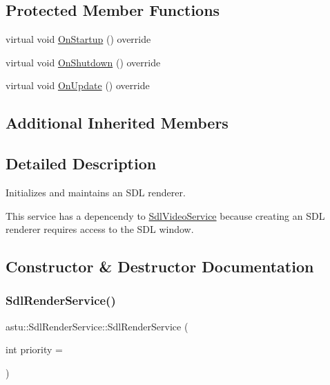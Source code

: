 \subsection*{Protected Member Functions}
\begin{DoxyCompactItemize}
\item 
virtual void \hyperlink{classastu_1_1SdlRenderService_a38abd541e8075e5e4eb702ca99c9b0a5}{On\+Startup} () override
\item 
virtual void \hyperlink{classastu_1_1SdlRenderService_a4f21478ca10de11d260792c3ccd79eef}{On\+Shutdown} () override
\item 
virtual void \hyperlink{classastu_1_1SdlRenderService_af109517e98ab8bce1e625122a441fb75}{On\+Update} () override
\end{DoxyCompactItemize}
\subsection*{Additional Inherited Members}


\subsection{Detailed Description}
Initializes and maintains an S\+DL renderer.

This service has a depencendy to \hyperlink{classastu_1_1SdlVideoService}{Sdl\+Video\+Service} because creating an S\+DL renderer requires access to the S\+DL window. 

\subsection{Constructor \& Destructor Documentation}
\mbox{\label{classastu_1_1SdlRenderService_a8669793d9701f979c90cd802575a2645}} 
\subsubsection{\texorpdfstring{Sdl\+Render\+Service()}{SdlRenderService()}}
{\footnotesize\ttfamily astu\+::\+Sdl\+Render\+Service\+::\+Sdl\+Render\+Service (\begin{DoxyParamCaption}\item[{int}]{priority = {} }\end{DoxyParamCaption})}

